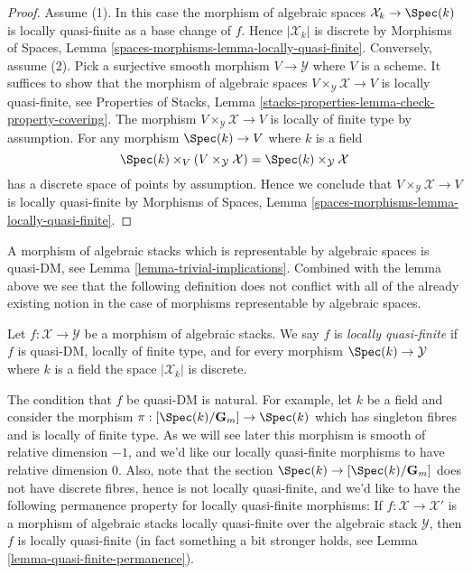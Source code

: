 \begin{proof}
Assume (1). In this case the morphism of algebraic spaces
$\mathcal{X}_k \to \Spec(k)$ is locally quasi-finite as a base change
of $f$. Hence $|\mathcal{X}_k|$ is discrete by
Morphisms of Spaces, Lemma \ref{spaces-morphisms-lemma-locally-quasi-finite}.
Conversely, assume (2). Pick a surjective smooth morphism
$V \to \mathcal{Y}$ where $V$ is a scheme. It suffices to show that the
morphism of algebraic spaces $V \times_\mathcal{Y} \mathcal{X} \to V$
is locally quasi-finite, see
Properties of Stacks, Lemma
\ref{stacks-properties-lemma-check-property-covering}.
The morphism $V \times_\mathcal{Y} \mathcal{X} \to V$ is locally of finite
type by assumption. For any morphism $\Spec(k) \to V$ where $k$ is a
field
$$
\Spec(k) \times_V (V \times_\mathcal{Y} \mathcal{X}) =
\Spec(k) \times_\mathcal{Y} \mathcal{X}
$$
has a discrete space of points by assumption. Hence we conclude that
$V \times_\mathcal{Y} \mathcal{X} \to V$ is locally quasi-finite by
Morphisms of Spaces, Lemma \ref{spaces-morphisms-lemma-locally-quasi-finite}.
\end{proof}

\noindent
A morphism of algebraic stacks which is representable by algebraic spaces
is quasi-DM, see
Lemma \ref{lemma-trivial-implications}.
Combined with the lemma above we see that the following definition
does not conflict with all of the already existing notion in the case
of morphisms representable by algebraic spaces.

\begin{definition}
\label{definition-quasi-finite}
Let $f : \mathcal{X} \to \mathcal{Y}$ be a morphism of algebraic stacks.
We say $f$ is {\it locally quasi-finite} if $f$ is quasi-DM, locally of
finite type, and for every morphism $\Spec(k) \to \mathcal{Y}$
where $k$ is a field the space $|\mathcal{X}_k|$ is discrete.
\end{definition}

\noindent
The condition that $f$ be quasi-DM is natural. For example, let $k$ be
a field and consider the morphism
$\pi : [\Spec(k)/\mathbf{G}_m] \to \Spec(k)$
which has singleton fibres and is locally of finite type. As we will see
later this morphism is smooth of relative dimension $-1$, and we'd
like our locally quasi-finite morphisms to have relative dimension $0$.
Also, note that the section $\Spec(k) \to [\Spec(k)/\mathbf{G}_m]$
does not have discrete fibres, hence is not locally quasi-finite, and we'd
like to have the following permanence property for locally quasi-finite
morphisms: If $f : \mathcal{X} \to \mathcal{X}'$ is a morphism of algebraic
stacks locally quasi-finite over the algebraic stack $\mathcal{Y}$, then
$f$ is locally quasi-finite (in fact something a bit stronger holds, see
Lemma \ref{lemma-quasi-finite-permanence}).

